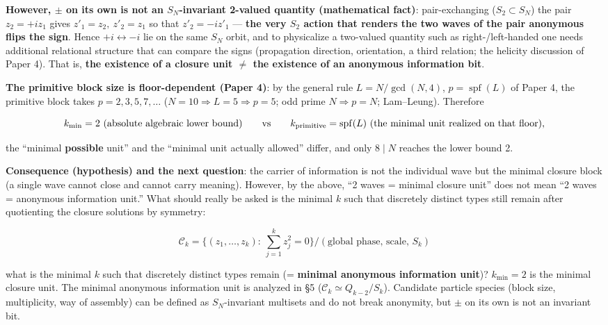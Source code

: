 \documentclass[
  a4paper,
]{ltjsarticle}
\begin{document}
\textbf{However, \(\pm\) on its own is not an \(S_N\)-invariant 2-valued
quantity (mathematical fact)}: pair-exchanging (\(S_2\subset S_N\)) the
pair \(z_2=+iz_1\) gives \(z'_1=z_2,\ z'_2=z_1\) so that \(z'_2=-iz'_1\)
--- \textbf{the very \(S_2\) action that renders the two waves of the
pair anonymous flips the sign}. Hence \(+i\leftrightarrow-i\) lie on the
same \(S_N\) orbit, and to physicalize a two-valued quantity such as
right-/left-handed one needs additional relational structure that can
compare the signs (propagation direction, orientation, a third relation;
the helicity discussion of Paper 4). That is, \textbf{the existence of a
closure unit \(\neq\) the existence of an anonymous information bit}.

\textbf{The primitive block size is floor-dependent (Paper 4)}: by the
general rule \(L=N/\gcd(N,4)\), \(p=\operatorname{spf}(L)\) of Paper 4,
the primitive block takes \(p=2,3,5,7,\ldots\)
(\(N=10\Rightarrow L=5\Rightarrow p=5\); odd prime \(N\Rightarrow p=N\);
Lam--Leung). Therefore

\[k_{\min}=2\ (\text{absolute algebraic lower bound})\qquad\text{vs}\qquad k_{\rm primitive}=\operatorname{spf}(L)\ (\text{the minimal unit realized on that floor}),\]

the ``minimal \textbf{possible} unit'' and the ``minimal unit actually
allowed'' differ, and only \(8\mid N\) reaches the lower bound 2.

\textbf{Consequence (hypothesis) and the next question}: the carrier of
information is not the individual wave but the minimal closure block (a
single wave cannot close and cannot carry meaning). However, by the
above, ``2 waves = minimal closure unit'' does not mean ``2 waves =
anonymous information unit.'' What should really be asked is the minimal
\(k\) such that discretely distinct types still remain after quotienting
the closure solutions by symmetry:

\[\mathcal C_k=\Big\{(z_1,\ldots,z_k):\ \textstyle\sum_{j=1}^k z_j^2=0\Big\}\Big/(\text{global phase, scale, }S_k)\]

what is the minimal \(k\) such that discretely distinct types remain (=
\textbf{minimal anonymous information unit})? \(k_{\min}=2\) is the
minimal closure unit. The minimal anonymous information unit is analyzed
in §5 (\(\mathcal C_k\simeq Q_{k-2}/S_k\)). Candidate particle species
(block size, multiplicity, way of assembly) can be defined as
\(S_N\)-invariant multisets and do not break anonymity, but \(\pm\) on
its own is not an invariant bit.
\end{document}
